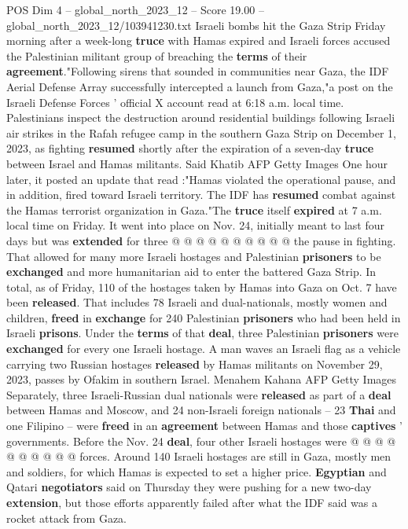 \begin{textsample}{POS Dim 4 – global\_north\_2023\_12 – Score 19.00 – global\_north\_2023\_12/103941230.txt}  \label{ex:f4_pos_307}
Israeli bombs hit the Gaza Strip Friday morning after a week-long \textbf{truce} with Hamas expired and Israeli forces accused the Palestinian militant group of breaching the \textbf{terms} of their \textbf{agreement}."Following sirens that sounded in communities near Gaza, the IDF Aerial Defense Array successfully intercepted a launch from Gaza,"a post on the Israeli Defense Forces ' official X account read at 6:18 a.m. local time.
Palestinians inspect the destruction around residential buildings following Israeli air strikes in the Rafah refugee camp in the southern Gaza Strip on December 1, 2023, as fighting \textbf{resumed} shortly after the expiration of a seven-day \textbf{truce} between Israel and Hamas militants.
Said Khatib AFP Getty Images One hour later, it posted an update that read :"Hamas violated the operational pause, and in addition, fired toward Israeli territory.
The IDF has \textbf{resumed} combat against the Hamas terrorist organization in Gaza."The \textbf{truce} itself \textbf{expired} at 7 a.m. local time on Friday.
It went into place on Nov. 24, initially meant to last four days but was \textbf{extended} for three @ @ @ @ @ @ @ @ @ @ the pause in fighting.
That allowed for many more Israeli hostages and Palestinian \textbf{prisoners} to be \textbf{exchanged} and more humanitarian aid to enter the battered Gaza Strip.
In total, as of Friday, 110 of the hostages taken by Hamas into Gaza on Oct. 7 have been \textbf{released}.
That includes 78 Israeli and dual-nationals, mostly women and children, \textbf{freed} in \textbf{exchange} for 240 Palestinian \textbf{prisoners} who had been held in Israeli \textbf{prisons}.
Under the \textbf{terms} of that \textbf{deal}, three Palestinian \textbf{prisoners} were \textbf{exchanged} for every one Israeli hostage.
A man waves an Israeli flag as a vehicle carrying two Russian hostages \textbf{released} by Hamas militants on November 29, 2023, passes by Ofakim in southern Israel.
Menahem Kahana AFP Getty Images Separately, three Israeli-Russian dual nationals were \textbf{released} as part of a \textbf{deal} between Hamas and Moscow, and 24 non-Israeli foreign nationals -- 23 \textbf{Thai} and one Filipino -- were \textbf{freed} in an \textbf{agreement} between Hamas and those \textbf{captives} ' governments.
Before the Nov. 24 \textbf{deal}, four other Israeli hostages were @ @ @ @ @ @ @ @ @ @ forces.
Around 140 Israeli hostages are still in Gaza, mostly men and soldiers, for which Hamas is expected to set a higher price. \textbf{Egyptian} and Qatari \textbf{negotiators} said on Thursday they were pushing for a new two-day \textbf{extension}, but those efforts apparently failed after what the IDF said was a rocket attack from Gaza.

\end{textsample}

